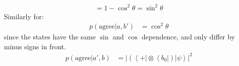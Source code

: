 \documentclass[12pt,a4]{article}
\begin{document}
\begin{enumerate}
\begin{enumerate}
\begin{align*}
                                  = 1 - \cos^2 \theta= \sin^2 \theta
        \end{align*}
        Similarly for:
        \begin{align*}
          p(\text{agree} | a, b') 
                                 &= \cos^2 \theta
        \end{align*}
        since the states have the same $\sin$ and $\cos$ dependence, and only differ by minus signs in front.
        \begin{align*}
          p(\text{agree} | a', b) &= |(\left\langle + \right| \otimes \left\langle b_0 \right|)\left|\psi\right\rangle|^2\\

\end{align*}
\end{enumerate}
\end{enumerate}
\end{document}
